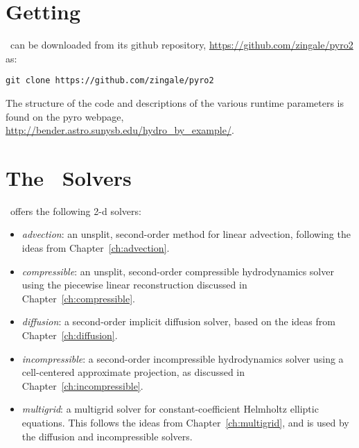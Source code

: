 

\begin{quote}
\end{quote}


\section{Getting \pyro}

\pyro\ can be downloaded from its github repository, \url{https://github.com/zingale/pyro2} as:
\begin{verbatim}
git clone https://github.com/zingale/pyro2
\end{verbatim}

The structure of the code and descriptions of the various runtime
parameters is found on the pyro webpage,
\url{http://bender.astro.sunysb.edu/hydro_by_example/}.

\section{The \pyro\ Solvers}

\pyro\ offers the following 2-d solvers:
\begin{itemize}
\item {\em advection}: an unsplit, second-order method for linear advection,
  following the ideas from Chapter~\ref{ch:advection}.

\item {\em compressible}: an unsplit, second-order compressible hydrodynamics
  solver using the piecewise linear reconstruction discussed in Chapter~\ref{ch:compressible}.

\item {\em diffusion}: a second-order implicit diffusion solver, based
  on the ideas from Chapter~\ref{ch:diffusion}.

\item {\em incompressible}: a second-order incompressible hydrodynamics
  solver using a cell-centered approximate projection, as discussed
  in Chapter~\ref{ch:incompressible}.

\item {\em multigrid}: a multigrid solver for constant-coefficient Helmholtz
  elliptic equations.  This follows the ideas from Chapter~\ref{ch:multigrid},
  and is used by the diffusion and incompressible solvers.

\end{itemize}

